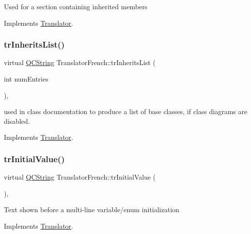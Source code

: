 Used for a section containing inherited members 

Implements \mbox{\hyperlink{class_translator}{Translator}}.

\mbox{\label{class_translator_french_a36a24656b52acc655a62514c9df0d4fe}} 
\subsubsection{\texorpdfstring{trInheritsList()}{trInheritsList()}}
{\footnotesize\ttfamily virtual \mbox{\hyperlink{class_q_c_string}{Q\+C\+String}} Translator\+French\+::tr\+Inherits\+List (\begin{DoxyParamCaption}\item[{int}]{num\+Entries }\end{DoxyParamCaption})\hspace{0.3cm}{\ttfamily [inline]}, {\ttfamily [virtual]}}

used in class documentation to produce a list of base classes, if class diagrams are disabled. 

Implements \mbox{\hyperlink{class_translator}{Translator}}.

\mbox{\label{class_translator_french_a2d8ef9ac7fc70ec9e2b90398a9f6c82d}} 
\subsubsection{\texorpdfstring{trInitialValue()}{trInitialValue()}}
{\footnotesize\ttfamily virtual \mbox{\hyperlink{class_q_c_string}{Q\+C\+String}} Translator\+French\+::tr\+Initial\+Value (\begin{DoxyParamCaption}{ }\end{DoxyParamCaption})\hspace{0.3cm}{\ttfamily [inline]}, {\ttfamily [virtual]}}

Text shown before a multi-\/line variable/enum initialization 

Implements \mbox{\hyperlink{class_translator}{Translator}}.

\mbox{\label{class_translator_french_a5ddbfaca30fab934a262086eb38edc27}} 
